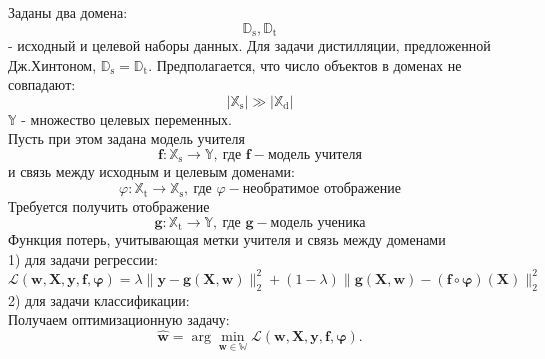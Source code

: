 Заданы два домена: $$\mathbb{D}_{\text{s}}, \mathbb{D}_{\text{t}}$$ - исходный и целевой наборы данных. Для задачи дистилляции, предложенной Дж.Хинтоном, $\mathbb{D}_{\text{s}}=\mathbb{D}_{\text{t}}$. Предполагается, что число объектов в доменах не совпадают: $$|\mathbb{X}_{\text{s}}| \gg |\mathbb{X}_{\text{d}}|$$
$\mathbb{Y}$ - множество целевых переменных.\\
Пусть при этом задана модель учителя
$$\textbf{f}: \mathbb{X}_{\text{s}} \rightarrow \mathbb{Y}, \ \text{где } \mathbf{f}-\text{модель учителя}$$
и связь между исходным и целевым доменами:
$$\varphi: \mathbb{X}_{\text{t}} \rightarrow \mathbb{X}_{\text{s}}, \ \text{где } \varphi-\text{необратимое отображение}$$ 
Требуется получить отображение $$\textbf{g}: \mathbb{X}_{\text{t}} \rightarrow \mathbb{Y}, \ \text{где } \mathbf{g}-\text{модель ученика}$$
Функция потерь, учитывающая метки учителя и связь между доменами\\
1) для задачи регрессии:
$$\mathcal{L}(\mathbf{w,X,y,f,\varphi})=\lambda\|\mathbf{y}-\mathbf{g}(\mathbf{X},\mathbf{w})\|_{2}^{2}+(1-\lambda)\|\mathbf{g}(\mathbf{X},\mathbf{w})-(\mathbf{f}\circ \mathbf{\varphi})(\mathbf{X})\|_{2}^{2}$$
2) для задачи классификации:\\
Получаем оптимизационную задачу:
$$\hat{\mathbf{w}} = \arg\min_{\mathbf{w} \in \mathbb{W}} \mathcal{L}(\mathbf{w,X,y,f,\varphi}).$$
